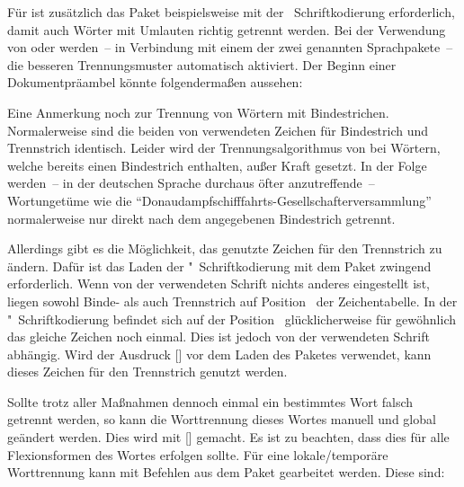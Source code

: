 Für  ist zusätzlich das Paket  beispielsweise 
mit der ~Schriftkodierung erforderlich, damit auch Wörter mit 
Umlauten richtig getrennt werden. Bei der Verwendung von  
oder  werden~-- in Verbindung mit einem der zwei genannten 
Sprachpakete~-- die besseren Trennungsmuster automatisch aktiviert. Der Beginn 
einer Dokumentpräambel könnte folgendermaßen aussehen:
%
\begin{quoting}[rightmargin=0pt]
\end{quoting}
%
Eine Anmerkung noch zur Trennung von Wörtern mit Bindestrichen. Normalerweise 
sind die beiden von  verwendeten Zeichen für Bindestrich und 
Trennstrich identisch. Leider wird der Trennungsalgorithmus von  
bei Wörtern, welche bereits einen Bindestrich enthalten, außer Kraft gesetzt. 
In der Folge werden~-- in der deutschen Sprache durchaus öfter anzutreffende~-- 
Wortungetüme wie die \enquote{Donaudampfschifffahrts-Gesellschafterversammlung} 
normalerweise nur direkt nach dem angegebenen Bindestrich getrennt. 

Allerdings gibt es die Möglichkeit, das genutzte Zeichen für den Trennstrich 
zu ändern. Dafür ist das Laden der "~Schriftkodierung mit dem Paket 
 zwingend erforderlich. Wenn von der verwendeten Schrift 
nichts anderes eingestellt ist, liegen sowohl Binde- als auch Trennstrich auf 
Position~ der Zeichentabelle. In der "~Schriftkodierung 
befindet sich auf der Position~ glücklicherweise für gewöhnlich das 
gleiche Zeichen noch einmal. Dies ist jedoch von der verwendeten Schrift 
abhängig. Wird der Ausdruck [] vor dem 
Laden des Paketes  verwendet, kann dieses Zeichen für den 
Trennstrich genutzt werden. 

Sollte trotz aller Maßnahmen dennoch einmal ein bestimmtes Wort falsch getrennt 
werden, so kann die Worttrennung dieses Wortes manuell und global geändert 
werden. Dies wird mit [] gemacht. 
Es ist zu beachten, dass dies für alle Flexionsformen des Wortes erfolgen 
sollte. Für eine lokale/temporäre Worttrennung kann mit Befehlen aus dem Paket 
 gearbeitet werden. Diese sind: 

